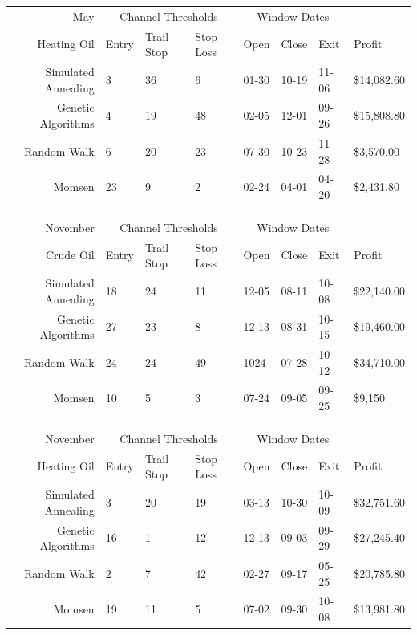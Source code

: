 \documentclass[12pt]{article}
\begin{document}
\begin{tabular}{|r|l|l|l|l|l|l|l|}
  \hline
  May & \multicolumn{3}{|c|}{Channel Thresholds} & \multicolumn{3}{|c|}{Window Dates} &  \\
  Heating Oil & Entry & Trail Stop & Stop Loss & Open & Close & Exit & Profit\\ \hline
  Simulated Annealing & 3 & 36 & 6 & 01-30 & 10-19 & 11-06 & \$14,082.60 \\ \hline
  Genetic Algorithms & 4 & 19 & 48 & 02-05 & 12-01 & 09-26 & \$15,808.80 \\ \hline
  Random Walk & 6 & 20 & 23 & 07-30 & 10-23 & 11-28 & \$3,570.00 \\ \hline
  Momsen & 23 & 9 & 2 & 02-24 & 04-01 & 04-20 & \$2,431.80 \\ \hline
\end{tabular}

\begin{tabular}{|r|l|l|l|l|l|l|l|}
  \hline
  November & \multicolumn{3}{|c|}{Channel Thresholds} & \multicolumn{3}{|c|}{Window Dates} &  \\
  Crude Oil & Entry & Trail Stop & Stop Loss & Open & Close & Exit & Profit\\ \hline
  Simulated Annealing & 18 & 24 & 11 & 12-05 & 08-11 & 10-08 & \$22,140.00 \\ \hline
  Genetic Algorithms & 27 & 23 & 8 & 12-13 & 08-31 & 10-15 & \$19,460.00 \\ \hline
  Random Walk & 24 & 24 & 49 & 1024 & 07-28 & 10-12 & \$34,710.00 \\ \hline
  Momsen & 10 & 5 & 3 & 07-24 & 09-05 & 09-25 & \$9,150 \\ \hline
\end{tabular}

\begin{tabular}{|r|l|l|l|l|l|l|l|}
  \hline
  November & \multicolumn{3}{|c|}{Channel Thresholds} & \multicolumn{3}{|c|}{Window Dates} &  \\
  Heating Oil & Entry & Trail Stop & Stop Loss & Open & Close & Exit & Profit\\ \hline
  Simulated Annealing & 3 & 20 & 19 & 03-13 & 10-30 & 10-09 & \$32,751.60 \\ \hline
  Genetic Algorithms & 16 & 1 & 12 & 12-13 & 09-03 & 09-29 & \$27,245.40 \\ \hline
  Random Walk & 2 & 7 & 42 & 02-27 & 09-17 & 05-25 & \$20,785.80 \\ \hline
  Momsen &  19 & 11 & 5 & 07-02 & 09-30 & 10-08 & \$13,981.80 \\ \hline
\end{tabular}
\end{document}
